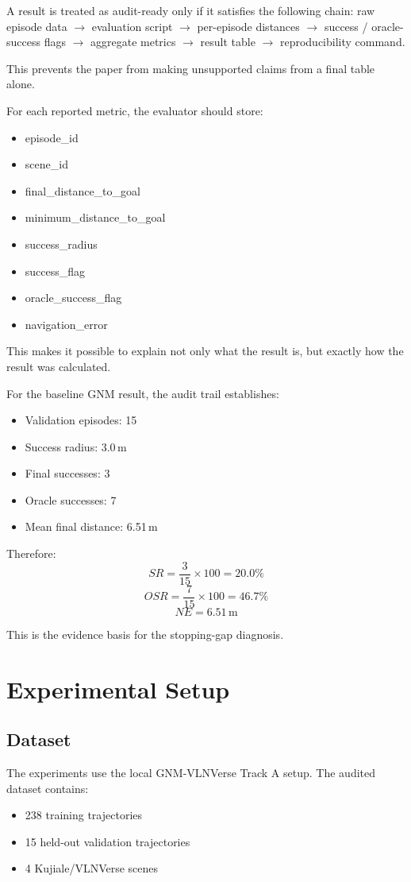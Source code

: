 \documentclass[conference]{IEEEtran}
\begin{document}
A result is treated as audit-ready only if it satisfies the following chain:
raw episode data $\to$ evaluation script $\to$ per-episode distances $\to$ success / oracle-success flags $\to$ aggregate metrics $\to$ result table $\to$ reproducibility command.

This prevents the paper from making unsupported claims from a final table alone.

For each reported metric, the evaluator should store:
\begin{itemize}
    \item episode\_id
    \item scene\_id
    \item final\_distance\_to\_goal
    \item minimum\_distance\_to\_goal
    \item success\_radius
    \item success\_flag
    \item oracle\_success\_flag
    \item navigation\_error
\end{itemize}

This makes it possible to explain not only what the result is, but exactly how the result was calculated.

For the baseline GNM result, the audit trail establishes:
\begin{itemize}
    \item Validation episodes: 15
    \item Success radius: 3.0\,m
    \item Final successes: 3
    \item Oracle successes: 7
    \item Mean final distance: 6.51\,m
\end{itemize}

Therefore:
\[
SR = \frac{3}{15} \times 100 = 20.0\%
\]
\[
OSR = \frac{7}{15} \times 100 = 46.7\%
\]
\[
NE = 6.51\,\text{m}
\]

This is the evidence basis for the stopping-gap diagnosis.

\section{Experimental Setup}

\subsection{Dataset}
The experiments use the local GNM-VLNVerse Track A setup. The audited dataset contains:
\begin{itemize}
    \item 238 training trajectories
    \item 15 held-out validation trajectories
    \item 4 Kujiale/VLNVerse scenes
\end{itemize}
\end{document}
